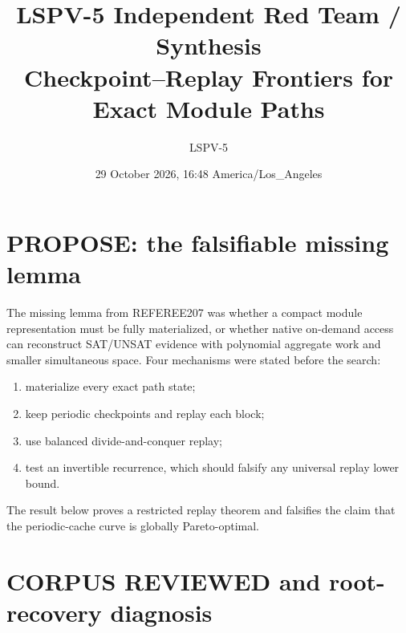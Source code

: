 \documentclass[11pt]{article}
\title{LSPV-5 Independent Red Team / Synthesis\\
Checkpoint--Replay Frontiers for Exact Module Paths}
\author{LSPV-5}
\date{29 October 2026, 16:48 America/Los\_Angeles}
\begin{document}
\sloppy
\maketitle

\begin{center}
\end{center}

\section{PROPOSE: the falsifiable missing lemma}

The missing lemma from REFEREE207 was whether a compact module representation must be fully
materialized, or whether native on-demand access can reconstruct SAT/UNSAT evidence with polynomial
aggregate work and smaller simultaneous space.  Four mechanisms were stated before the search:
\begin{enumerate}
\item materialize every exact path state;
\item keep periodic checkpoints and replay each block;
\item use balanced divide-and-conquer replay;
\item test an invertible recurrence, which should falsify any universal replay lower bound.
\end{enumerate}
The result below proves a restricted replay theorem and falsifies the claim that the periodic-cache
curve is globally Pareto-optimal.

\section{CORPUS REVIEWED and root-recovery diagnosis}
\end{document}
